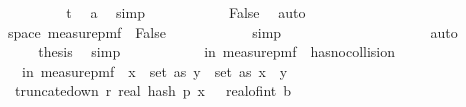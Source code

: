 \begin{isabellebody}
\ \ \ \ \ \ \ \ \isamarkupfalse%
\ \isamarkupfalse%
\ {\isachardoublequoteopen}{\isachardot}{\kern0pt}{\isachardot}{\kern0pt}{\isachardot}{\kern0pt}\ {\isacharless}{\kern0pt}\ t{\isachardoublequoteclose}\ \isamarkupfalse%
\ a{\isacharunderscore}{\kern0pt}{}\ \isamarkupfalse%
\ simp\isanewline
\ \ \ \ \ \ \ \ \isamarkupfalse%
\ \isamarkupfalse%
\ {\isachardoublequoteopen}False{\isachardoublequoteclose}\ \isamarkupfalse%
\ auto\isanewline
\ \ \ \ \ \ \ \ \isamarkupfalse%
\ {\isachardoublequoteopen}{\isasymomega}\ {\isasymin}\ {\isacharbraceleft}{\kern0pt}{\isasymomega}\ {\isasymin}\ space\ {\isacharparenleft}{\kern0pt}measure{\isacharunderscore}{\kern0pt}pmf\ {\isasymOmega}\ False{\isacharbraceright}{\kern0pt}{\isachardoublequoteclose}\isanewline
\ \ \ \ \ \ \ \ \ \ \isamarkupfalse%
\ simp\isanewline
\ \ \ \ \ \ \isamarkupfalse%
\isanewline
\ \ \ \ \ \ \isamarkupfalse%
\ \isamarkupfalse%
\ {\isachardoublequoteopen}{\isachardot}{\kern0pt}{\isachardot}{\kern0pt}{\isachardot}{\kern0pt}\ {\isacharequal}{\kern0pt}\ {}{\isachardoublequoteclose}\ \isamarkupfalse%
\ auto\isanewline
\ \ \ \ \ \ \isamarkupfalse%
\ \isamarkupfalse%
\ {\isacharquery}{\kern0pt}thesis\ \isamarkupfalse%
\ simp\isanewline
\ \ \ \ \isamarkupfalse%
\isanewline
\isanewline
\ \ \ \ \isamarkupfalse%
\ {\isachardoublequoteopen}{\isasymP}{\isacharparenleft}{\kern0pt}{\isasymomega}\ in\ measure{\isacharunderscore}{\kern0pt}pmf\ {\isasymOmega}\ {\isasymnot}has{\isacharunderscore}{\kern0pt}no{\isacharunderscore}{\kern0pt}collision\ {\isasymomega}{\isacharparenright}{\kern0pt}\ {\isasymle}\isanewline
\ \ \ \ \ \ {\isasymP}{\isacharparenleft}{\kern0pt}{\isasymomega}\ in\ measure{\isacharunderscore}{\kern0pt}pmf\ {\isasymOmega}\ {\isasymexists}x\ {\isasymin}\ set\ as{\isachardot}{\kern0pt}\ {\isasymexists}y\ {\isasymin}\ set\ as{\isachardot}{\kern0pt}\ x\ {\isasymnoteq}\ y\ {\isasymand}\ \isanewline
\ \ \ \ \ \ truncate{\isacharunderscore}{\kern0pt}down\ r\ {\isacharparenleft}{\kern0pt}real\ {\isacharparenleft}{\kern0pt}hash\ p\ x\ {\isasymomega}{\isacharparenright}{\kern0pt}{\isacharparenright}{\kern0pt}\ {\isasymle}\ real{\isacharunderscore}{\kern0pt}of{\isacharunderscore}{\kern0pt}int\ b\ {\isasymand}\ \isanewline

\end{isabellebody}
